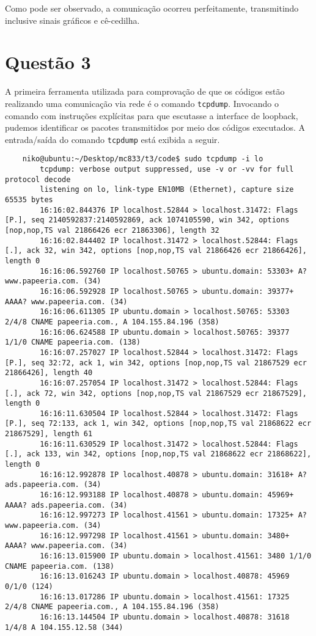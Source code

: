 \documentclass[a4paper,10pt]{article}
\begin{document}
    Como pode ser observado, a comunicação ocorreu perfeitamente, transmitindo inclusive sinais gráficos e cê-cedilha.

\section{Questão 3}
    A primeira ferramenta utilizada para comprovação de que os códigos estão realizando uma comunicação via rede é o comando {\tt tcpdump}. Invocando o comando com instruções explícitas para que escutasse a interface de loopback, pudemos identificar os pacotes transmitidos por meio dos códigos executados. A entrada/saída do comando {\tt tcpdump} está exibida a seguir.
    
    \begin{lstlisting}
    niko@ubuntu:~/Desktop/mc833/t3/code$ sudo tcpdump -i lo
        tcpdump: verbose output suppressed, use -v or -vv for full protocol decode
        listening on lo, link-type EN10MB (Ethernet), capture size 65535 bytes
        16:16:02.844376 IP localhost.52844 > localhost.31472: Flags [P.], seq 2140592837:2140592869, ack 1074105590, win 342, options [nop,nop,TS val 21866426 ecr 21863306], length 32
        16:16:02.844402 IP localhost.31472 > localhost.52844: Flags [.], ack 32, win 342, options [nop,nop,TS val 21866426 ecr 21866426], length 0
        16:16:06.592760 IP localhost.50765 > ubuntu.domain: 53303+ A? www.papeeria.com. (34)
        16:16:06.592928 IP localhost.50765 > ubuntu.domain: 39377+ AAAA? www.papeeria.com. (34)
        16:16:06.611305 IP ubuntu.domain > localhost.50765: 53303 2/4/8 CNAME papeeria.com., A 104.155.84.196 (358)
        16:16:06.624588 IP ubuntu.domain > localhost.50765: 39377 1/1/0 CNAME papeeria.com. (138)
        16:16:07.257027 IP localhost.52844 > localhost.31472: Flags [P.], seq 32:72, ack 1, win 342, options [nop,nop,TS val 21867529 ecr 21866426], length 40
        16:16:07.257054 IP localhost.31472 > localhost.52844: Flags [.], ack 72, win 342, options [nop,nop,TS val 21867529 ecr 21867529], length 0
        16:16:11.630504 IP localhost.52844 > localhost.31472: Flags [P.], seq 72:133, ack 1, win 342, options [nop,nop,TS val 21868622 ecr 21867529], length 61
        16:16:11.630529 IP localhost.31472 > localhost.52844: Flags [.], ack 133, win 342, options [nop,nop,TS val 21868622 ecr 21868622], length 0
        16:16:12.992878 IP localhost.40878 > ubuntu.domain: 31618+ A? ads.papeeria.com. (34)
        16:16:12.993188 IP localhost.40878 > ubuntu.domain: 45969+ AAAA? ads.papeeria.com. (34)
        16:16:12.997273 IP localhost.41561 > ubuntu.domain: 17325+ A? www.papeeria.com. (34)
        16:16:12.997298 IP localhost.41561 > ubuntu.domain: 3480+ AAAA? www.papeeria.com. (34)
        16:16:13.015900 IP ubuntu.domain > localhost.41561: 3480 1/1/0 CNAME papeeria.com. (138)
        16:16:13.016243 IP ubuntu.domain > localhost.40878: 45969 0/1/0 (124)
        16:16:13.017286 IP ubuntu.domain > localhost.41561: 17325 2/4/8 CNAME papeeria.com., A 104.155.84.196 (358)
        16:16:13.144504 IP ubuntu.domain > localhost.40878: 31618 1/4/8 A 104.155.12.58 (344)

    \end{lstlisting}
    
\end{document}
